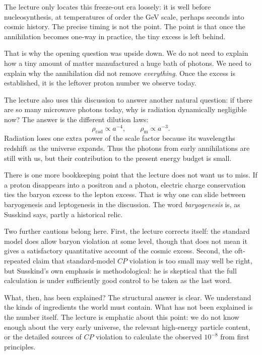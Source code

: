 The lecture only locates this freeze-out era loosely: it is well before nucleosynthesis, at temperatures of order the GeV scale, perhaps seconds into cosmic history. The precise timing is not the point. The point is that once the annihilation becomes one-way in practice, the tiny excess is left behind.

That is why the opening question was upside down. We do not need to explain how a tiny amount of matter manufactured a huge bath of photons. We need to explain why the annihilation did not remove \emph{everything}. Once the excess is established, it is the leftover proton number we observe today.

The lecture also uses this discussion to answer another natural question: if there are so many microwave photons today, why is radiation dynamically negligible now? The answer is the different dilution laws:
\begin{equation}
\rho_{\mathrm{rad}}\propto a^{-4},
\qquad
\rho_{\mathrm{m}}\propto a^{-3}.
\end{equation}
Radiation loses one extra power of the scale factor because its wavelengths redshift as the universe expands. Thus the photons from early annihilations are still with us, but their contribution to the present energy budget is small.

There is one more bookkeeping point that the lecture does not want us to miss. If a proton disappears into a positron and a photon, electric charge conservation ties the baryon excess to the lepton excess. That is why one can slide between baryogenesis and leptogenesis in the discussion. The word \emph{baryogenesis} is, as Susskind says, partly a historical relic.

Two further cautions belong here. First, the lecture corrects itself: the standard model does allow baryon violation at some level, though that does not mean it gives a satisfactory quantitative account of the cosmic excess. Second, the oft-repeated claim that standard-model \(CP\) violation is too small may well be right, but Susskind's own emphasis is methodological: he is skeptical that the full calculation is under sufficiently good control to be taken as the last word.

What, then, has been explained? The structural answer is clear. We understand the kinds of ingredients the world must contain. What has not been explained is the number itself. The lecture is emphatic about this point: we do not know enough about the very early universe, the relevant high-energy particle content, or the detailed sources of \(CP\) violation to calculate the observed \(10^{-8}\) from first principles.

